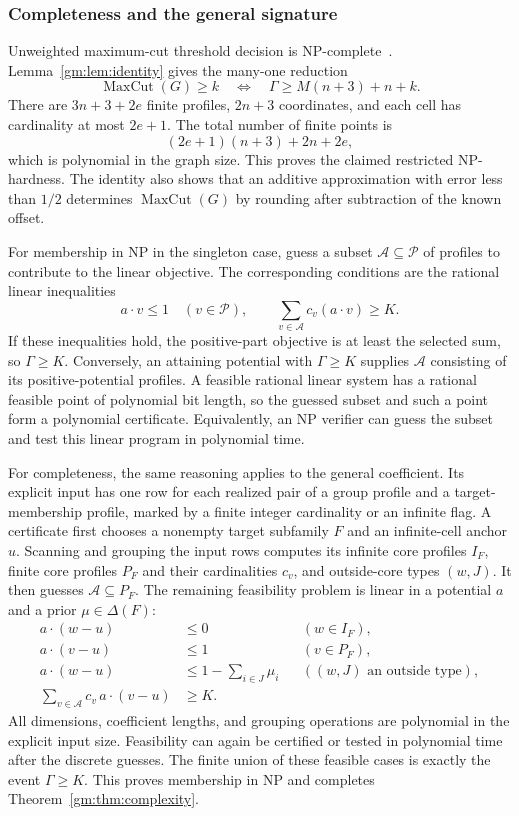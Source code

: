 \subsubsection{Completeness and the general signature}
Unweighted maximum-cut threshold decision is NP-complete~\citep{GJS1976}. Lemma~\ref{gm:lem:identity} gives the many-one reduction
\[
\operatorname{MaxCut}(G)\ge k
\quad\Longleftrightarrow\quad
\Gamma\ge M(n+3)+n+k.
\]
There are $3n+3+2e$ finite profiles, $2n+3$ coordinates, and each cell has cardinality at most $2e+1$. The total number of finite points is
\[
(2e+1)(n+3)+2n+2e,
\]
which is polynomial in the graph size. This proves the claimed restricted NP-hardness. The identity also shows that an additive approximation with error less than $1/2$ determines $\operatorname{MaxCut}(G)$ by rounding after subtraction of the known offset.

For membership in NP in the singleton case, guess a subset $\mathcal A\subseteq\mathcal P$ of profiles to contribute to the linear objective. The corresponding conditions are the rational linear inequalities
\[
a\cdot v\le1\quad(v\in\mathcal P),\qquad
\sum_{v\in\mathcal A}c_v(a\cdot v)\ge K.
\]
If these inequalities hold, the positive-part objective is at least the selected sum, so $\Gamma\ge K$. Conversely, an attaining potential with $\Gamma\ge K$ supplies $\mathcal A$ consisting of its positive-potential profiles. A feasible rational linear system has a rational feasible point of polynomial bit length, so the guessed subset and such a point form a polynomial certificate. Equivalently, an NP verifier can guess the subset and test this linear program in polynomial time.

For completeness, the same reasoning applies to the general coefficient. Its explicit input has one row for each realized pair of a group profile and a target-membership profile, marked by a finite integer cardinality or an infinite flag. A certificate first chooses a nonempty target subfamily $F$ and an infinite-cell anchor $u$. Scanning and grouping the input rows computes its infinite core profiles $I_F$, finite core profiles $P_F$ and their cardinalities $c_v$, and outside-core types $(w,J)$. It then guesses $\mathcal A\subseteq P_F$. The remaining feasibility problem is linear in a potential $a$ and a prior $\mu\in\Delta(F)$:
\begin{align*}
a\cdot(w-u)&\le0&&(w\in I_F),\\
a\cdot(v-u)&\le1&&(v\in P_F),\\
a\cdot(w-u)&\le1-\sum_{i\in J}\mu_i&&((w,J)\text{ an outside type}),\\
\sum_{v\in\mathcal A}c_v\,a\cdot(v-u)&\ge K.
\end{align*}
All dimensions, coefficient lengths, and grouping operations are polynomial in the explicit input size. Feasibility can again be certified or tested in polynomial time after the discrete guesses. The finite union of these feasible cases is exactly the event $\Gamma\ge K$. This proves membership in NP and completes Theorem~\ref{gm:thm:complexity}.

